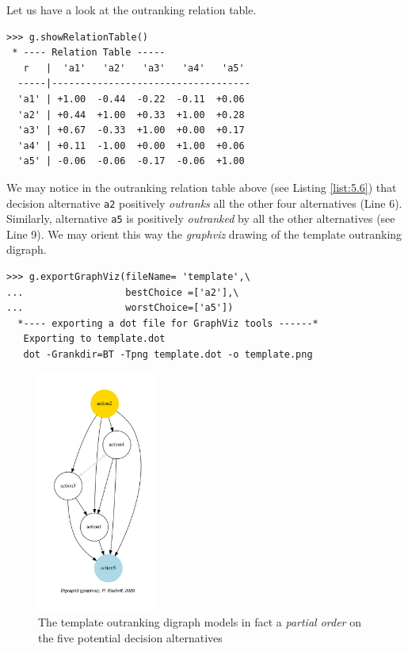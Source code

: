Let us have a look at the outranking relation table.
\begin{lstlisting}[caption={The template outranking relation},label=list:5.6]
>>> g.showRelationTable()
 * ---- Relation Table -----
   r   |  'a1'   'a2'   'a3'   'a4'   'a5'   
  -----|-----------------------------------
  'a1' | +1.00  -0.44  -0.22  -0.11  +0.06  
  'a2' | +0.44  +1.00  +0.33  +1.00  +0.28  
  'a3' | +0.67  -0.33  +1.00  +0.00  +0.17  
  'a4' | +0.11  -1.00  +0.00  +1.00  +0.06  
  'a5' | -0.06  -0.06  -0.17  -0.06  +1.00
\end{lstlisting}
We may notice in the outranking relation table above (see Listing \ref{list:5.6}) that decision alternative \texttt{a2} positively \emph{outranks} all the other four alternatives  (Line 6). Similarly, alternative \texttt{a5} is positively \emph{outranked} by all the other alternatives (see Line 9). We may orient this way the \emph{graphviz} drawing of the template outranking digraph. 
\begin{lstlisting}
>>> g.exportGraphViz(fileName= 'template',\
...                  bestChoice =['a2'],\
...                  worstChoice=['a5'])
  *---- exporting a dot file for GraphViz tools ------*
   Exporting to template.dot
   dot -Grankdir=BT -Tpng template.dot -o template.png
\end{lstlisting}
\begin{figure}[h]
\sidecaption[t]
\includegraphics[width=4cm]{Figures/5-1-template.pdf}
\caption{The template outranking digraph models in fact a \emph{partial order} on the five potential decision alternatives}
\label{fig:5.1}       %
\end{figure}

